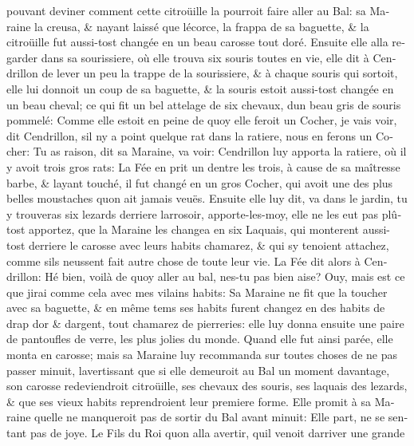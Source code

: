 \documentclass[14pt,a4paper]{memoir}
\begin{document}
{{\begin{otherlanguage}{french}
pouvant deviner comment cette citroüille la pourroit faire aller au Bal:
sa Maraine la creusa, \& n\textquotesingle ayant laissé que
l\textquotesingle écorce, la frappa de sa baguette, \& la citroüille fut
aussi-tost changée en un beau carosse tout doré. Ensuite elle alla
regarder dans sa sourissiere, où elle trouva six souris toutes en vie,
elle dit à Cendrillon de lever un peu la trappe de la sourissiere, \& à
chaque souris qui sortoit, elle lui donnoit un coup de sa baguette, \&
la souris estoit aussi-tost changée en un beau cheval; ce qui fit un bel
attelage de six chevaux, d\textquotesingle un beau gris de souris
pommelé: Comme elle estoit en peine de quoy elle feroit un Cocher, je
vais voir, dit Cendrillon, s\textquotesingle il n\textquotesingle y a
point quelque rat dans la ratiere, nous en ferons un Cocher: Tu as
raison, dit sa Maraine, va voir: Cendrillon luy apporta la ratiere, où
il y avoit trois gros rats: La Fée en prit un d\textquotesingle entre
les trois, à cause de sa maîtresse barbe, \& l\textquotesingle ayant
touché, il fut changé en un gros Cocher, qui avoit une des plus belles
moustaches qu\textquotesingle on ait jamais veuës. Ensuite elle luy dit,
va dans le jardin, tu y trouveras six lezards derriere
l\textquotesingle arrosoir, apporte-les-moy, elle ne les eut pas plûtost
apportez, que la Maraine les changea en six Laquais, qui monterent
aussi-tost derriere le carosse avec leurs habits chamarez, \& qui
s\textquotesingle y tenoient attachez, comme s\textquotesingle ils
n\textquotesingle eussent fait autre chose de toute leur vie. La Fée dit
alors à Cendrillon: Hé bien, voilà de quoy aller au bal,
n\textquotesingle es-tu pas bien aise? Ouy, mais est ce que
j\textquotesingle irai comme cela avec mes vilains habits: Sa Maraine ne
fit que la toucher avec sa baguette, \& en même tems ses habits furent
changez en des habits de drap d\textquotesingle or \&
d\textquotesingle argent, tout chamarez de pierreries: elle luy donna
ensuite une paire de pantoufles de verre, les plus jolies du monde.
Quand elle fut ainsi parée, elle monta en carosse; mais sa Maraine luy
recommanda sur toutes choses de ne pas passer minuit,
l\textquotesingle avertissant que si elle demeuroit au Bal un moment
davantage, son carosse redeviendroit citroüille, ses chevaux des souris,
ses laquais des lezards, \& que ses vieux habits reprendroient leur
premiere forme. Elle promit à sa Maraine qu\textquotesingle elle ne
manqueroit pas de sortir du Bal avant minuit: Elle part, ne se sentant
pas de joye. Le Fils du Roi qu\textquotesingle on alla avertir,
qu\textquotesingle il venoit d\textquotesingle arriver une grande

\end{otherlanguage}}}
\end{document}
